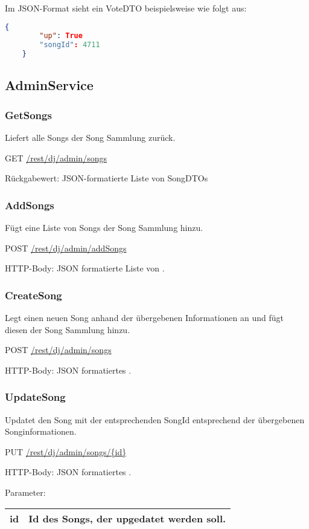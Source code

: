 Im JSON-Format sieht ein VoteDTO beispielsweise wie folgt aus:

\begin{lstlisting}[language=json]
    {
        "up": True
        "songId": 4711
    }
\end{lstlisting}

\subsection{AdminService}

\subsubsection{GetSongs}
\label{service:GetSongs}
Liefert alle Songs der Song Sammlung zurück.

GET
\url{/rest/dj/admin/songs}

Rückgabewert: JSON-formatierte Liste von SongDTOs 


\subsubsection{AddSongs}
\label{service:AddSongs}
Fügt eine Liste von Songs der Song Sammlung hinzu.

POST
\url{/rest/dj/admin/addSongs}

HTTP-Body: JSON formatierte Liste von .

\subsubsection{CreateSong}
\label{service:CreateSong}
Legt einen neuen Song anhand der übergebenen Informationen an und fügt diesen der Song Sammlung hinzu.

POST
\url{/rest/dj/admin/songs}

HTTP-Body: JSON formatiertes .


\subsubsection{UpdateSong}
\label{service:UpdateSong}
Updatet den Song mit der entsprechenden SongId entsprechend der übergebenen Songinformationen.

PUT
\url{/rest/dj/admin/songs/{id}}

HTTP-Body: JSON formatiertes .

Parameter:\\
\begin{tabularx}{\textwidth}{|l|X|}
\hline id & Id des Songs, der upgedatet werden soll. \\ 
\hline 
\end{tabularx}


